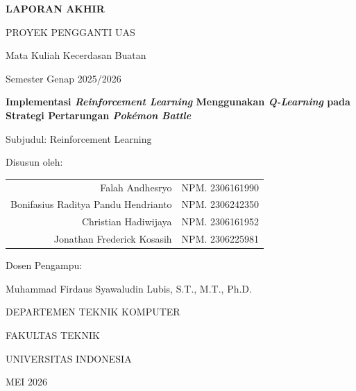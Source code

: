 \documentclass[11pt,a4paper,oneside]{report}
\begin{document}
\begin{titlepage}
\centering
\vspace*{1cm}

{\Large\bfseries LAPORAN AKHIR \par}
{\large PROYEK PENGGANTI UAS \par}
\vspace{0.3cm}
{\large Mata Kuliah Kecerdasan Buatan \par}
{\large Semester Genap 2025/2026 \par}

\vspace{2cm}


\vspace{1.5cm}

{\LARGE\bfseries Implementasi \textit{Reinforcement Learning} Menggunakan \textit{Q-Learning} pada Strategi Pertarungan \textit{Pokémon Battle} \par}
\vspace{0.5cm}
{\large Subjudul: Reinforcement Learning \par}

\vspace{2.5cm}

{\large Disusun oleh: \par}
\vspace{0.5cm}
\begin{tabular}{rl}
{Falah Andhesryo} & NPM. 2306161990 \\
{Bonifasius Raditya Pandu Hendrianto} & NPM. 2306242350 \\
{Christian Hadiwijaya} & NPM. 2306161952 \\
 {Jonathan Frederick Kosasih} & NPM. 2306225981 \\
\end{tabular}

\vspace{2cm}

{\large Dosen Pengampu: \par}
{\large Muhammad Firdaus Syawaludin Lubis, S.T., M.T., Ph.D. \par}

\vfill

{\large DEPARTEMEN TEKNIK KOMPUTER \par}
{\large FAKULTAS TEKNIK \par}
{\large UNIVERSITAS INDONESIA \par}
{\large MEI 2026 \par}
\end{titlepage}
\end{document}
